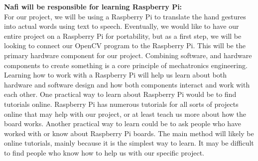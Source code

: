 \documentclass[12pt]{article}
\begin{document}
\textbf{Nafi will be responsible for learning Raspberry Pi:}\\
For our project, we will be using a Raspberry Pi to translate the hand gestures into actual words using text to speech. Eventually, we
would like to have our entire project on a Raspberry Pi for portability, but as a first step, we will be looking to connect our OpenCV 
program to the Raspberry Pi. This will be the primary hardware component for our project. Combining software, and hardware components to 
create something is a core principle of mechatronics engineering. Learning how to work with a Raspberry Pi will help us learn about both 
hardware and software design and how both components interact and work with each other. One practical way to learn about Raspberry Pi would
be to find tutorials online. Raspberry Pi has numerous tutorials for all sorts of projects online that may help with our project, or at least
teach us more about how the board works. Another practical way to learn could be to ask people who have worked with or know about Raspberry 
Pi boards. The main method will likely be online tutorials, mainly because it is the simplest way to learn. It may be difficult to find people
who know how to help us with our specific project.\\
\end{document}
